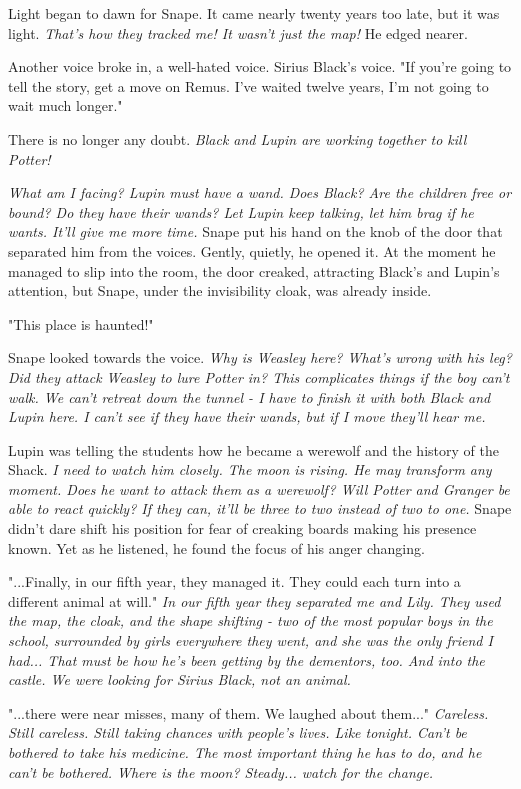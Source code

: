 Light began to dawn for Snape. It came nearly twenty years too late, but it was light. \emph{That's how they tracked me! It wasn't just the map!} He edged nearer.

Another voice broke in, a well-hated voice. Sirius Black's voice. "If you're going to tell the story, get a move on Remus. I've waited twelve years, I'm not going to wait much longer."

There is no longer any doubt. \emph{Black and Lupin are working together to kill Potter!}

\emph{What am I facing? Lupin must have a wand. Does Black? Are the children free or bound? Do they have their wands? Let Lupin keep talking, let him brag if he wants. It'll give me more time.} Snape put his hand on the knob of the door that separated him from the voices. Gently, quietly, he opened it. At the moment he managed to slip into the room, the door creaked, attracting Black's and Lupin's attention, but Snape, under the invisibility cloak, was already inside.

"This place is haunted!"

Snape looked towards the voice. \emph{Why is Weasley here? What's wrong with his leg? Did they attack Weasley to lure Potter in? This complicates things if the boy can't walk. We can't retreat down the tunnel - I have to finish it with both Black and Lupin here. I can't see if they have their wands, but if I move they'll hear me.}

Lupin was telling the students how he became a werewolf and the history of the Shack. \emph{I need to watch him closely. The moon is rising. He may transform any moment. Does he want to attack them as a werewolf? Will Potter and Granger be able to react quickly? If they can, it'll be three to two instead of two to one.} Snape didn't dare shift his position for fear of creaking boards making his presence known. Yet as he listened, he found the focus of his anger changing.

"...Finally, in our fifth year, they managed it. They could each turn into a different animal at will." \emph{In our fifth year they separated me and Lily. They used the map, the cloak, and the shape shifting - two of the most popular boys in the school, surrounded by girls everywhere they went, and she was the only friend I had... That must be how he's been getting by the dementors, too. And into the castle. We were looking for Sirius Black, not an animal.}

"...there were near misses, many of them. We laughed about them..." \emph{Careless. Still careless. Still taking chances with people's lives. Like tonight. Can't be bothered to take his medicine. The most important thing he has to do, and he can't be bothered. Where is the moon? Steady... watch for the change.}

